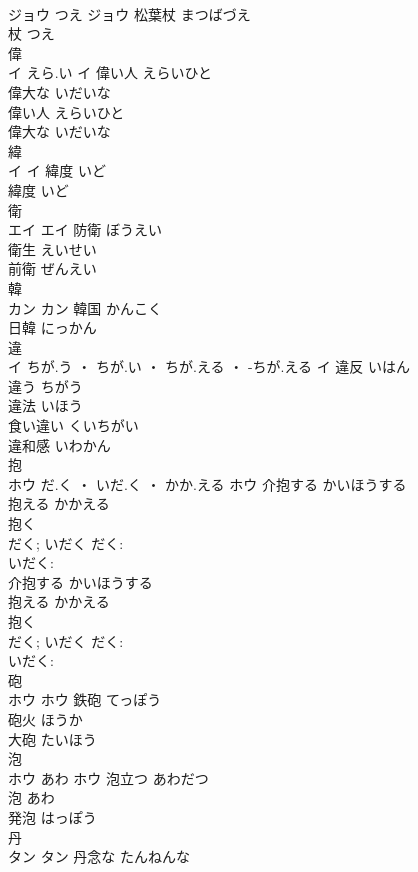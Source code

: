 \documentclass[8pt]{extreport}
\begin{document}
\begin{CJK}{UTF8}{min}
\\	ジョウ	つえ	ジョウ													松葉杖	まつばづえ	
\\	杖	つえ	
\\	偉	
\\	イ	えら.い	イ	偉い人	えらいひと	
\\	偉大な	いだいな	
\\	偉い人	えらいひと	
\\	偉大な	いだいな	
\\	緯	
\\	イ		イ	緯度	いど	
\\	緯度	いど	
\\	衛	
\\	エイ		エイ	防衛	ぼうえい	
\\	衛生	えいせい	
\\	前衛	ぜんえい	
\\	韓	
\\	カン		カン	韓国	かんこく	
\\	日韓	にっかん	
\\	違	
\\	イ	ちが.う ・ ちが.い ・ ちが.える ・ -ちが.える	イ	違反	いはん	
\\	違う	ちがう	
\\	違法	いほう	
\\	食い違い	くいちがい	
\\	違和感	いわかん	
\\	抱	
\\	ホウ	だ.く ・ いだ.く ・ かか.える	ホウ	介抱する	かいほうする	
\\	抱える	かかえる	
\\	抱く 
\\	だく; いだく	だく: 
\\	いだく: 
\\	介抱する	かいほうする	
\\	抱える	かかえる	
\\	抱く 
\\	だく; いだく	だく: 
\\	いだく: 
\\	砲	
\\	ホウ		ホウ	鉄砲	てっぽう	
\\	砲火	ほうか	
\\	大砲	たいほう	
\\	泡	
\\	ホウ	あわ	ホウ	泡立つ	あわだつ	
\\	泡	あわ	
\\	発泡	はっぽう	
\\	丹	
\\	タン		タン	丹念な	たんねんな	

\end{CJK}
\end{document}
